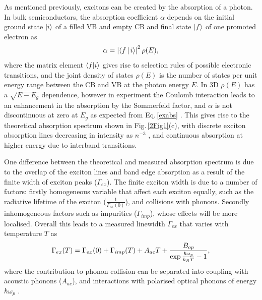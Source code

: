 As mentioned previously, excitons can be created by the absorption of a photon. In bulk semiconductors, the absorption coefficient $\alpha$ depends on the initial ground state $\ket{i}$ of a filled VB and empty CB and final state $\ket{f}$ of one promoted electron as
\begin{equation}
\centering
\alpha = \left| \Braket{f | i} \right|^2 \rho(E) ,
\label{exabs}
\end{equation}
where the matrix element $\braket{f | i}$ gives rise to selection rules of possible electronic transitions, and the joint density of states $\rho(E)$ is the number of states per unit energy range between the CB and VB at the photon energy $E$. In 3D $\rho(E)$ has a $\sqrt{E-E_g}$ dependence, however in experiment the Coulomb interaction leads to an enhancement in the absorption by the Sommerfeld factor, and $\alpha$ is not discontinuous at zero at $E_g$ as expected from Eq.\,\ref{exabs} \cite{Bassu1997}. This gives rise to the theoretical absorption spectrum shown in Fig.\,\ref{2Fig1}(c), with discrete exciton absorption lines decreasing in intensity as $n^{-3}$ \cite{Bassu1997}, and continuous absorption at higher energy due to interband transitions. 

One difference between the theoretical and measured absorption spectrum is due to the overlap of the exciton lines and band edge absorption as a result of the finite width of exciton peaks ($\Gamma_{ex}$). The finite exciton width is due to a number of factors: firstly homogeneous variable that affect each exciton equally, such as the radiative lifetime of the exciton ($\frac{1}{\Gamma_{ex}(0)}$), and collisions with phonons. Secondly inhomogeneous factors such as impurities ($\Gamma_{imp}$), whose effects will be more localised. Overall this leads to a measured linewidth $\Gamma_{ex}$ that varies with temperature $T$ as
\begin{equation}
\centering
\Gamma_{ex}(T) = \Gamma_{ex}(0) +  \Gamma_{imp}(T) +A_{ac}T + \frac{B_{op}}{\exp{\frac{\hbar\omega_p}{k_B T}}-1},
\label{exwidth}
\end{equation}
where the contribution to phonon collision can be separated into coupling with acoustic phonons ($A_{ac}$), and interactions with polarised optical phonons of energy $\hbar\omega_p$ \cite{Dammak2009}. 

